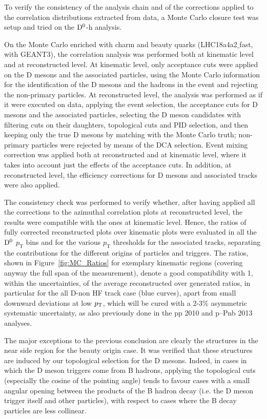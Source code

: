 \label{MCclosure}
To verify the consistency of the analysis chain and of the corrections applied to the  correlation distributions extracted from data, a Monte Carlo closure test was setup and tried on the ${\rm D^0}$-h analysis.

On the Monte Carlo enriched with charm and beauty quarks (LHC18a4a2$\_$fast, with GEANT3), the correlation analysis was performed both at kinematic level and at reconstructed level. At kinematic level, only acceptance cuts were applied on the D mesons and the associated particles, using the Monte Carlo information for the identification of the D mesons and the hadrons in the event and rejecting the non-primary particles. At reconstructed level, the analysis was performed as if it were executed on data, applying the event selection, the acceptance cuts for D mesons and the associated particles, selecting the D meson candidates with filtering cuts on their daughters, topological cuts and PID selection, and then keeping only the true D mesons by matching with the Monte Carlo truth; non-primary particles were rejected by means of the DCA selection. Event mixing correction was applied both at reconstructed and at kinematic level, where it takes into account just the effects of the acceptance cuts. In addition, at reconstructed level, the efficiency corrections for D mesons and associated tracks were also applied.

The consistency check was performed to verify whether, after having applied all the corrections to the azimuthal correlation plots at reconstructed level, the results were compatible with the ones at kinematic level. Hence, the ratios of fully corrected reconstructed plots over kinematic plots were evaluated in all the ${\rm D^0}$ $p_\text{T}$ bins and for the various $p_\text{T}$ thresholds for the associated tracks, separating the contributions for the different origins of particles and triggers. The ratios, shown in Figure~\ref{fig:MC_Ratios} for exemplary kinematic regions (covering anyway the full span of the measurement), denote a good compatibility with 1, within the uncertainties, of the average reconstructed over generated ratios, in particular for the all D-non HF track case (blue curves), apart from small downward deviations at low $p_{\rm T}$, which will be cured with a 2-3\% asymmetric systematic uncertainty, as also previously done in the pp 2010 and p--Pnb 2013 analyses.

The major exceptions to the previous conclusion are clearly the structures in the near side region for the beauty origin case.
It was verified that these structures are induced by our topological selection for the D mesons. Indeed, in cases in which the D meson triggers come from B hadrons, applying the topological cuts (especially the cosine of the pointing angle) tends to favour cases with a small angular opening between the products of the B hadron decay (i.e. the D meson trigger itself and other particles), with respect to cases where the B decay particles are less collinear.

